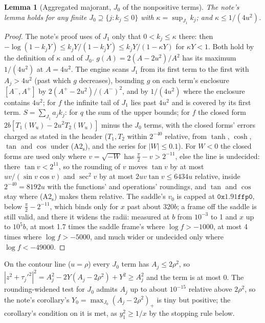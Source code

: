 \documentclass[11pt]{article}
\newtheorem{lemma}[theorem]{Lemma}
\theoremstyle{definition}
\begin{document}
\begin{lemma}[Aggregated majorant, $J_0$ of the nonpositive terms]\label{lem:agg2}
The note's lemma holds for any finite $J_0\supseteq\{j:k_j\le0\}$ with $\kappa=\sup_{J_1}k_j$; and $\kappa\le1/(4u^2)$.
\end{lemma}
\begin{proof}
The note's proof uses of $J_1$ only that $0<k_j\le\kappa$ there: then $-\log(1-k_jY)\le k_jY/(1-k_jY)\le k_jY/(1-
\kappa Y)$ for $\kappa Y<1$. Both hold by the definition of $\kappa$ and of $J_0$. $g(A)=2(A-2u^2)/A^2$ has its
maximum $1/(4u^2)$ at $A=4u^2$. The engine scans $J_1$ from its first term to the first with $A_j>4u^2$ (past which
$g$ decreases), bounding $g$ on each term's enclosure $[A^-,A^+]$ by $2(A^+-2u^2)/(A^-)^2$, and by $1/(4u^2)$ where
the enclosure contains $4u^2$; for $f$ the infinite tail of $J_1$ lies past $4u^2$ and is covered by its first term.
$S=\sum_{J_1}a_jk_j$: for $q$ the sum of the upper bounds; for $f$ the closed form $2b[T_1(W_u)-2u^2T_2(W_u)]$ minus
the $J_0$ terms, with the closed forms' errors charged as stated in the header ($T_1,T_2$ within $2^{-40}$
relative, from $\tanh$, $\cosh$, $\tan$ and $\cos$ under (A2$_{\mathrm s}$), and the series for $|W|\le0.1$). For
$W<0$ the closed forms are used only where $v=\sqrt{-W}$ has $\frac\pi2-v>2^{-11}$, else the line is undecided:
there $\tan v<2^{11}$, so the rounding of $v$ moves $\tan v$ by at most $uv/(\sin v\cos v)$ and $\sec^2v$ by at most
$2uv\tan v\le6434u$ relative, inside $2^{-40}=8192u$ with the functions' and operations' roundings, and $\tan$ and
$\cos$ stay where (A2$_{\mathrm s}$) makes them relative. The saddle's $v_0$ is capped at $\mathtt{0x1.91ffp0}$,
below $\frac\pi2-2^{-11}$, which binds only for $x$ past about $320b$; a frame off the saddle is still valid, and
there it widens the radii: measured at $b$ from $10^{-3}$ to 1 and $x$ up to $10^5b$, at most 1.7 times the saddle
frame's where $\log f>-1000$, at most 4 times where $\log f>-5000$, and much wider or undecided only where $\log f<
-49000$.
\end{proof}
On the contour line ($u=\rho$) every $J_0$ term has $A_j\le2\rho^2$, so $|z^2+\tau_j'^2|^2=A_j^2-2Y(A_j-2\rho^2)+Y^2\ge
A_j^2$ and the term is at most 0. The rounding-widened test for $J_0$ admits $A_j$ up to about $10^{-15}$
relative above $2\rho^2$, so the note's corollary's $Y_0=\max_{J_0}(A_j-2\rho^2)_+$ is tiny but positive; the
corollary's condition on it is met, as $y_1^2\ge1/x$ by the stopping rule below.
\end{document}
